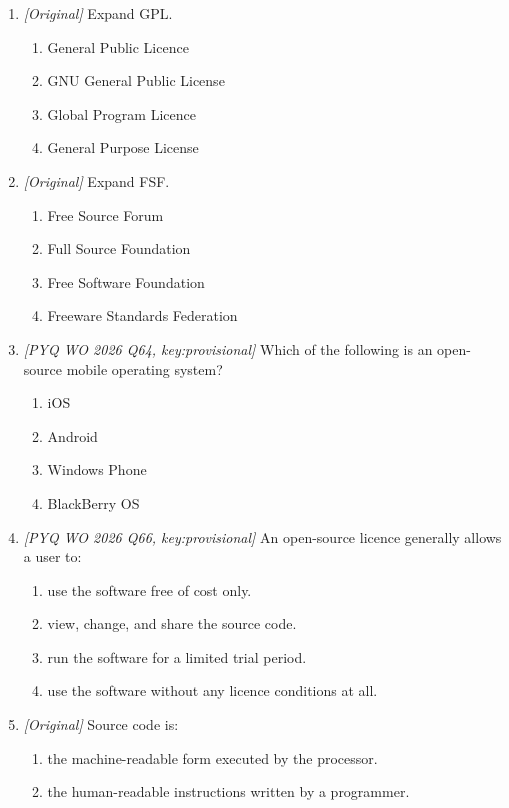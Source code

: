 \begin{enumerate}[label=\textbf{Q\arabic*.}, leftmargin=*]
\item \textit{[Original]} Expand GPL.
  \begin{enumerate}[label=\Alph*.]
    \item General Public Licence
    \item GNU General Public License
    \item Global Program Licence
    \item General Purpose License
  \end{enumerate}
\item \textit{[Original]} Expand FSF.
  \begin{enumerate}[label=\Alph*.]
    \item Free Source Forum
    \item Full Source Foundation
    \item Free Software Foundation
    \item Freeware Standards Federation
  \end{enumerate}
\item \textit{[PYQ WO 2026 Q64, key:provisional]} Which of the following is an
  open-source mobile operating system?
  \begin{enumerate}[label=\Alph*.]
    \item iOS
    \item Android
    \item Windows Phone
    \item BlackBerry OS
  \end{enumerate}
\item \textit{[PYQ WO 2026 Q66, key:provisional]} An open-source licence
  generally allows a user to:
  \begin{enumerate}[label=\Alph*.]
    \item use the software free of cost only.
    \item view, change, and share the source code.
    \item run the software for a limited trial period.
    \item use the software without any licence conditions at all.
  \end{enumerate}
\item \textit{[Original]} Source code is:
  \begin{enumerate}[label=\Alph*.]
    \item the machine-readable form executed by the processor.
    \item the human-readable instructions written by a programmer.

\end{enumerate}
\end{enumerate}
